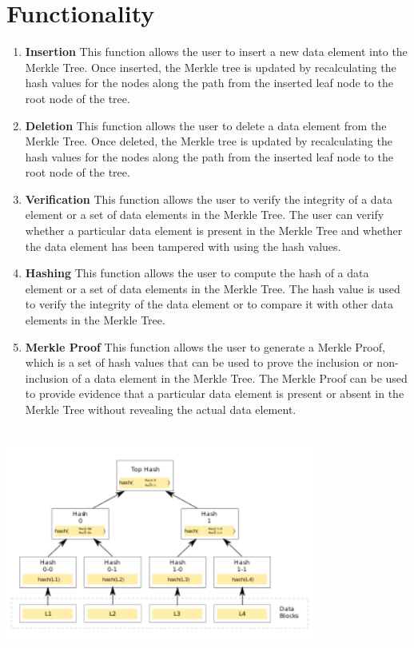 \documentclass{article}
\begin{document}
\section{Functionality}
\begin{enumerate}
    \item \textbf{Insertion} This function allows the user to insert a new data element into the Merkle Tree. Once inserted, the Merkle tree is updated by recalculating the hash values for the nodes along the path from the inserted leaf node to the root node of the tree.
    \item \textbf{Deletion} This function allows the user to delete a data element from the Merkle Tree. Once deleted, the Merkle tree is updated by recalculating the hash values for the nodes along the path from the inserted leaf node to the root node of the tree.
    \item \textbf{Verification} This function allows the user to verify the integrity of a data element or a set of data elements in the Merkle Tree. The user can verify whether a particular data element is present in the Merkle Tree and whether the data element has been tampered with using the hash values.
    \item \textbf{Hashing} This function allows the user to compute the hash of a data element or a set of data elements in the Merkle Tree. The hash value is used to verify the integrity of the data element or to compare it with other data elements in the Merkle Tree.
    \item \textbf{Merkle Proof} This function allows the user to generate a Merkle Proof, which is a set of hash values that can be used to prove the inclusion or non-inclusion of a data element in the Merkle Tree. The Merkle Proof can be used to provide evidence that a particular data element is present or absent in the Merkle Tree without revealing the actual data element.
\end{enumerate}
\includegraphics[width=4in,height=3in]{Hash_Tree.png}
\end{document}
